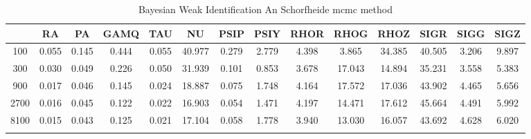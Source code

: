 \documentclass[a4paper,10pt]{article}
\begin{document}
\centering
\begin{longtable}{cccccccccccccc}
\toprule
 & RA & PA & GAMQ & TAU & NU & PSIP & PSIY & RHOR & RHOG & RHOZ & SIGR & SIGG & SIGZ \\
\midrule
100 & 0.055 & 0.145 & 0.444 & 0.055 & 40.977 & 0.279 & 2.779 & 4.398 & 3.865 & 34.385 & 40.505 & 3.206 & 9.897 \\
300 & 0.030 & 0.049 & 0.226 & 0.050 & 31.939 & 0.101 & 0.853 & 3.678 & 17.043 & 14.894 & 35.231 & 3.558 & 5.383 \\
900 & 0.017 & 0.046 & 0.145 & 0.024 & 18.887 & 0.075 & 1.748 & 4.164 & 17.572 & 17.036 & 43.902 & 4.465 & 5.656 \\
2700 & 0.016 & 0.045 & 0.122 & 0.022 & 16.903 & 0.054 & 1.471 & 4.197 & 14.471 & 17.612 & 45.664 & 4.491 & 5.992 \\
8100 & 0.015 & 0.043 & 0.125 & 0.021 & 17.104 & 0.058 & 1.778 & 3.940 & 13.030 & 16.057 & 43.692 & 4.628 & 6.020 \\
\bottomrule
\caption{Bayesian Weak Identification An Schorfheide mcmc method}
\label{table:tbl:WeakAnScho_mcmc}
\end{longtable}
\end{document}
